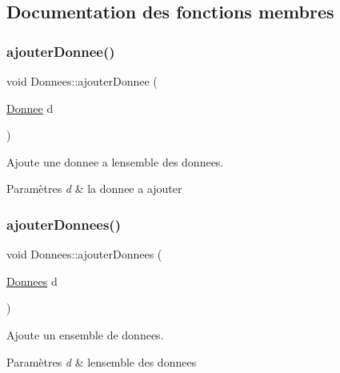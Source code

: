 \subsection{Documentation des fonctions membres}
\mbox{\label{class_donnees_a7f77ebe53ea55a3293cefb864d60e7ff}} 
\subsubsection{\texorpdfstring{ajouter\+Donnee()}{ajouterDonnee()}}
{\footnotesize\ttfamily void Donnees\+::ajouter\+Donnee (\begin{DoxyParamCaption}\item[{\hyperlink{class_donnee}{Donnee}}]{d }\end{DoxyParamCaption})}



Ajoute une donnee a l\textquotesingle{}ensemble des donnees. 


\begin{DoxyParams}{Paramètres}
{\em d} & la donnee a ajouter \\
\hline
\end{DoxyParams}
\mbox{\label{class_donnees_a26d282aff1a7adfdcaea1a3cab6ffbaf}} 
\subsubsection{\texorpdfstring{ajouter\+Donnees()}{ajouterDonnees()}}
{\footnotesize\ttfamily void Donnees\+::ajouter\+Donnees (\begin{DoxyParamCaption}\item[{\hyperlink{class_donnees}{Donnees}}]{d }\end{DoxyParamCaption})}



Ajoute un ensemble de donnees. 


\begin{DoxyParams}{Paramètres}
{\em d} & l\textquotesingle{}ensemble des donnees \\
\hline
\end{DoxyParams}
\mbox{\label{class_donnees_a1986c4b95b3cf90767dbe966b2497ae8}} 
